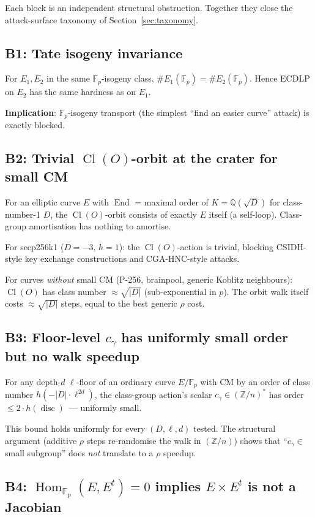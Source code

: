 \documentclass[11pt,a4paper]{article}
\theoremstyle{definition}
\newcommand{\FF}{\mathbb{F}}
\newcommand{\ZZ}{\mathbb{Z}}
\newcommand{\QQ}{\mathbb{Q}}
\newcommand{\End}{\operatorname{End}}
\newcommand{\Hom}{\operatorname{Hom}}
\newcommand{\Cl}{\operatorname{Cl}}
\newcommand{\disc}{\operatorname{disc}}
\begin{document}
Each block is an independent structural obstruction. Together they
close the attack-surface taxonomy of Section~\ref{sec:taxonomy}.

\subsection*{B1: Tate isogeny invariance}

For $E_1, E_2$ in the same $\FF_p$-isogeny class,
$\#E_1(\FF_p) = \#E_2(\FF_p)$. Hence ECDLP on $E_2$ has the same
hardness as on $E_1$.

\textbf{Implication}: $\FF_p$-isogeny transport (the simplest
``find an easier curve'' attack) is exactly blocked.

\subsection*{B2: Trivial $\Cl(O)$-orbit at the crater for small CM}

For an elliptic curve $E$ with $\End$ = maximal order of
$K = \QQ(\sqrt{D})$ for class-number-1 $D$, the $\Cl(O)$-orbit
consists of exactly $E$ itself (a self-loop). Class-group
amortisation has nothing to amortise.

For secp256k1 ($D = -3$, $h = 1$): the $\Cl(O)$-action is trivial,
blocking CSIDH-style key exchange constructions and CGA-HNC-style
attacks.

For curves \emph{without} small CM (P-256, brainpool, generic
Koblitz neighbours): $\Cl(O)$ has class number $\approx \sqrt{|D|}$
(sub-exponential in $p$). The orbit walk itself costs $\approx
\sqrt{|D|}$ steps, equal to the best generic $\rho$ cost.

\subsection*{B3: Floor-level $c_\gamma$ has uniformly small order but
no walk speedup}

For any depth-$d$ $\ell$-floor of an ordinary curve $E/\FF_p$ with
CM by an order of class number $h(-|D| \cdot \ell^{2d})$, the
class-group action's scalar $c_\gamma \in (\ZZ/n)^*$ has order
$\leq 2 \cdot h(\disc)$~--- uniformly small.

This bound holds uniformly for every $(D, \ell, d)$ tested. The
structural argument (additive $\rho$ steps re-randomise the walk
in $(\ZZ/n)$) shows that ``$c_\gamma \in$ small subgroup'' does
\emph{not} translate to a $\rho$ speedup.

\subsection*{B4: $\Hom_{\FF_p}(E, E^t) = 0$ implies $E \times E^t$
is not a Jacobian}
\end{document}
